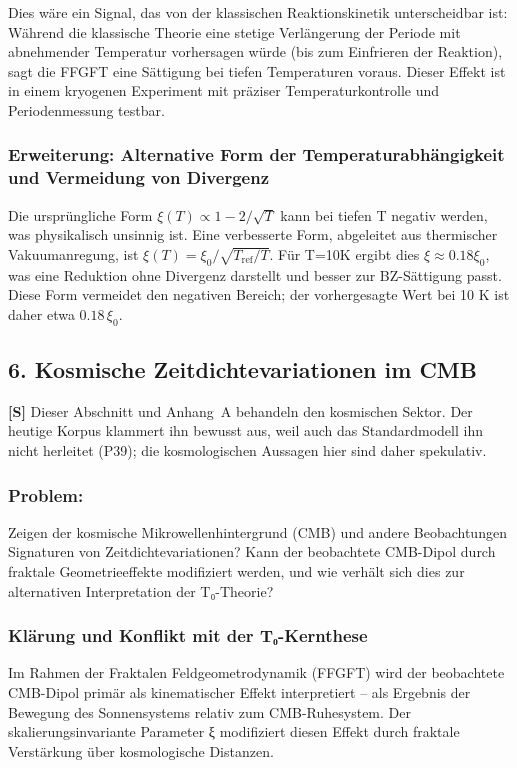 Dies wäre ein Signal, das von der klassischen Reaktionskinetik unterscheidbar ist: Während die klassische Theorie eine stetige Verlängerung der Periode mit abnehmender Temperatur vorhersagen würde (bis zum Einfrieren der Reaktion), sagt die FFGFT eine Sättigung bei tiefen Temperaturen voraus. Dieser Effekt ist in einem kryogenen Experiment mit präziser Temperaturkontrolle und Periodenmessung testbar.

\subsubsection*{Erweiterung: Alternative Form der Temperaturabhängigkeit und Vermeidung von Divergenz}
Die ursprüngliche Form $\xi(T) \propto 1 - 2/\sqrt{T}$ kann bei tiefen T negativ werden, was physikalisch unsinnig ist. Eine verbesserte Form, abgeleitet aus thermischer Vakuumanregung, ist $\xi(T) = \xi_0 / \sqrt{T_{\text{ref}}/T}$. Für T=10K ergibt dies $\xi \approx 0.18 \xi_0$, was eine Reduktion ohne Divergenz darstellt und besser zur BZ-Sättigung passt. Diese Form vermeidet den negativen Bereich; der vorhergesagte Wert bei 10 K ist daher etwa $0.18\,\xi_0$.

\subsection*{6. Kosmische Zeitdichtevariationen im CMB}

\textbf{[S]} Dieser Abschnitt und Anhang~A behandeln den kosmischen Sektor. Der heutige Korpus klammert ihn bewusst aus, weil auch das Standardmodell ihn nicht herleitet (P39); die kosmologischen Aussagen hier sind daher spekulativ.

\subsubsection*{Problem:}
Zeigen der kosmische Mikrowellenhintergrund (CMB) und andere Beobachtungen Signaturen von Zeitdichtevariationen? Kann der beobachtete CMB-Dipol durch fraktale Geometrieeffekte modifiziert werden, und wie verhält sich dies zur alternativen Interpretation der T₀-Theorie?

\subsubsection*{Klärung und Konflikt mit der T₀-Kernthese}

Im Rahmen der Fraktalen Feldgeometrodynamik (FFGFT) wird der beobachtete CMB-Dipol primär als kinematischer Effekt interpretiert – als Ergebnis der Bewegung des Sonnensystems relativ zum CMB-Ruhesystem. Der skalierungsinvariante Parameter ξ modifiziert diesen Effekt durch fraktale Verstärkung über kosmologische Distanzen.

